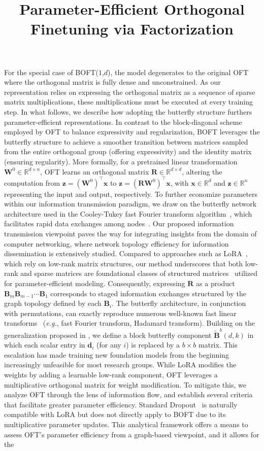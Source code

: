 \title{Parameter-Efficient Orthogonal Finetuning via Factorization}
For the special case of BOFT($1$,$d$), the model degenerates to the original OFT~\cite{qiu2023controlling} where the orthogonal matrix is fully dense and unconstrained. As our representation relies on expressing the orthogonal matrix as a sequence of sparse matrix multiplications, these multiplications must be executed at every training step. In what follows, we describe how adopting the butterfly structure furthers parameter-efficient representations. In contrast to the block-diagonal scheme employed by OFT to balance expressivity and regularization, BOFT leverages the butterfly structure to achieve a smoother transition between matrices sampled from the entire orthogonal group (offering expressivity) and the identity matrix (ensuring regularity). More formally, for a pretrained linear transformation $\bm{W}^0\in\mathbb{R}^{d\times n}$, OFT learns an orthogonal matrix $\bm{R}\in\mathbb{R}^{d\times d}$, altering the computation from $\bm{z}=(\bm{W}^0)^\top\bm{x}$ to $\bm{z}=(\bm{R}\bm{W}^0)^\top\bm{x}$, with $\bm{x}\in\mathbb{R}^{d}$ and $\bm{z}\in\mathbb{R}^{n}$ representing the input and output, respectively. To further economize parameters within our information transmission paradigm, we draw on the butterfly network architecture used in the Cooley-Tukey fast Fourier transform algorithm~\cite{cooley1965algorithm}, which facilitates rapid data exchanges among nodes~\cite{klasing1994broadcasting}. Our proposed information transmission viewpoint paves the way for integrating insights from the domain of computer networking, where network topology efficiency for information dissemination is extensively studied. Compared to approaches such as LoRA~\cite{hulora2022}, which rely on low-rank matrix structures, our method underscores that both low-rank and sparse matrices are foundational classes of structured matrices~\cite{candes2011robust} utilized for parameter-efficient modeling. Consequently, expressing $\bm{R}$ as a product $\bm{B}_m\bm{B}_{m-1}\cdots\bm{B}_1$ corresponds to staged information exchanges structured by the graph topology defined by each $\bm{B}_i$. The butterfly architecture, in conjunction with permutations, can exactly reproduce numerous well-known fast linear transforms~\cite{dao2019learning,dao2019kaleidoscope} (\emph{e.g.}, fast Fourier transform, Hadamard transform). Building on the generalization proposed in \cite{chen2022pixelated}, we define a block butterfly component $\tilde{\bm{B}}^b(d,k)$ in which each scalar entry in $\bm{d}_i$ (for any $i$) is replaced by a $b\times b$ matrix. This escalation has made training new foundation models from the beginning increasingly unfeasible for most research groups. While LoRA modifies the weights by adding a learnable low-rank component, OFT leverages a multiplicative orthogonal matrix for weight modification. To mitigate this, we analyze OFT through the lens of information flow, and establish several criteria that facilitate greater parameter efficiency. Standard Dropout~\cite{srivastava2014dropout} is naturally compatible with LoRA but does not directly apply to BOFT due to its multiplicative parameter updates. This analytical framework offers a means to assess OFT's parameter efficiency from a graph-based viewpoint, and it allows for the 